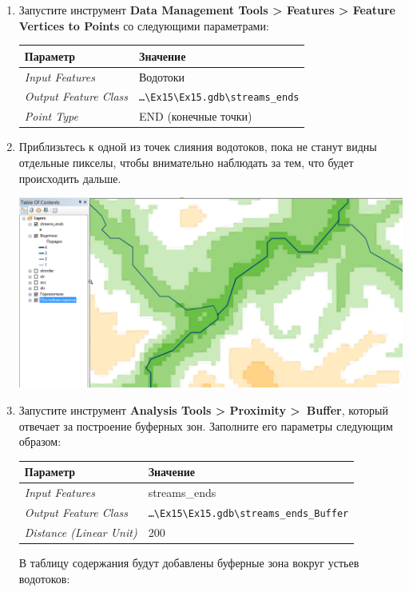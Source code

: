 \documentclass[]{book}
\theoremstyle{definition}
\theoremstyle{definition}
\theoremstyle{definition}
\theoremstyle{remark}
\begin{document}
\begin{enumerate}
\def\labelenumi{\arabic{enumi}.}
\item
  Запустите инструмент \textbf{Data Management Tools \textgreater{}
  Features \textgreater{} Feature Vertices to Points} со следующими
  параметрами:

  \begin{longtable}[]{@{}ll@{}}
  \toprule
  Параметр & Значение\tabularnewline
  \midrule
  \endhead
  \emph{Input Features} & Водотоки\tabularnewline
  \emph{Output Feature Class} &
  \texttt{\ldots{}\textbackslash{}Ex15\textbackslash{}Ex15.gdb\textbackslash{}streams\_ends}\tabularnewline
  \emph{Point Type} & END (конечные точки)\tabularnewline
  \bottomrule
  \end{longtable}
\item
  Приблизьтесь к одной из точек слияния водотоков, пока не станут видны
  отдельные пикселы, чтобы внимательно наблюдать за тем, что будет
  происходить дальше.

  \includegraphics{images/Ex15/image19.png}
\item
  Запустите инструмент \textbf{Analysis Tools \textgreater{} Proximity
  \textgreater{}~Buffer}, который отвечает за построение буферных зон.
  Заполните его параметры следующим образом:

  \begin{longtable}[]{@{}ll@{}}
  \toprule
  Параметр & Значение\tabularnewline
  \midrule
  \endhead
  \emph{Input Features} & streams\_ends\tabularnewline
  \emph{Output Feature Class} &
  \texttt{\ldots{}\textbackslash{}Ex15\textbackslash{}Ex15.gdb\textbackslash{}streams\_ends\_Buffer}\tabularnewline
  \emph{Distance (Linear Unit)} & 200\tabularnewline
  \bottomrule
  \end{longtable}

  В таблицу содержания будут добавлены буферные зона вокруг устьев
  водотоков:


\end{enumerate}
\end{document}
